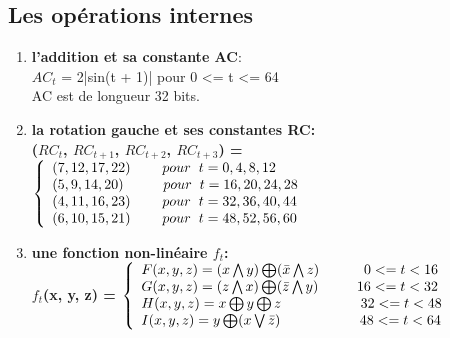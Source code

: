 \subsection{Les opérations internes}
\begin{enumerate}
\item {\bf{l'addition et sa constante AC}}:\\
$AC_{t}$ = 2|sin(t + 1)| \hspace{.5cm} pour 0 <= t <= 64\\
AC est de longueur 32 bits.

\item \bf{la rotation gauche et ses constantes RC}:\\
($RC_{t}$, $RC_{t+1}$, $RC_{t+2}$, $RC_{t+3}$) =
$\left\{
\begin{array}{l}
  (7, 12, 17, 22)   \hspace{.8cm}pour \hspace{.2cm} t = 0, 4, 8, 12 \\
  (5, 9, 14, 20)  \hspace{1cm}pour \hspace{.2cm} t = 16, 20, 24, 28 \\
  (4, 11, 16, 23)  \hspace{.8cm}pour \hspace{.2cm} t = 32, 36, 40, 44 \\
  (6, 10, 15, 21)  \hspace{.8cm}pour \hspace{.2cm} t = 48, 52, 56, 60 \\
\end{array}
\right.$
\vspace{.5cm}
\item \bf{une fonction non-linéaire $f_{t}$}:\\

$f_{t}$(x, y, z) =
$\left\{
\begin{array}{l}
  F(x, y, z) = (x  \bigwedge y) \bigoplus (\bar x \bigwedge z) \hspace{1.128cm} 0 <= t < 16\\
  G(x, y, z) = (z  \bigwedge x) \bigoplus (\bar z \bigwedge y) \hspace{.97cm} 16 <= t < 32\\
  H(x, y, z) = x \bigoplus y \bigoplus z \hspace{2cm} 32 <= t < 48\\
  I(x, y, z) = y \bigoplus (x \bigvee \bar z) \hspace{2cm} 48 <= t < 64\\
\end{array}
\right.$
\vspace{.5cm}
\end{enumerate}

